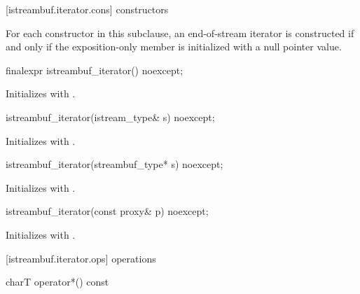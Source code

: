 [istreambuf.iterator.cons]{ constructors}

\pnum
For each  constructor in this subclause,
an end-of-stream iterator is constructed if and only if
the exposition-only member  is initialized with a null pointer value.


%
\begin{itemdecl}
finalexpr istreambuf_iterator() noexcept;
\end{itemdecl}

\begin{itemdescr}
\pnum
\effects
Initializes  with .
\end{itemdescr}


%
\begin{itemdecl}
istreambuf_iterator(istream_type& s) noexcept;
\end{itemdecl}

\begin{itemdescr}
\pnum
\effects
Initializes  with .
\end{itemdescr}


%
\begin{itemdecl}
istreambuf_iterator(streambuf_type* s) noexcept;
\end{itemdecl}

\begin{itemdescr}
\pnum
\effects
Initializes  with .
\end{itemdescr}


%
\begin{itemdecl}
istreambuf_iterator(const proxy& p) noexcept;
\end{itemdecl}

\begin{itemdescr}
\pnum
\effects
Initializes  with .
\end{itemdescr}

[istreambuf.iterator.ops]{ operations}

%
\begin{itemdecl}
charT operator*() const
\end{itemdecl}

